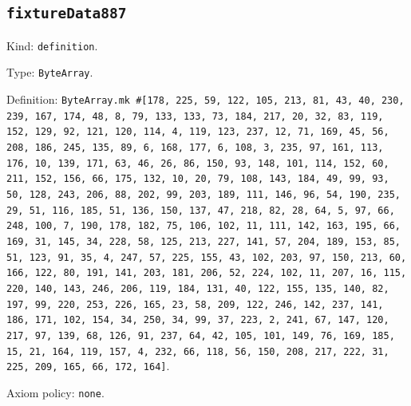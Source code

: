 \documentclass[11pt]{article}
\begin{document}
\subsection*{\texttt{fixtureData887}}
\noindent Kind: \texttt{definition}.\par
\noindent Type: \texttt{ByteArray}.\par
\noindent Definition: \texttt{ByteArray.mk \#[178, 225, 59, 122, 105, 213, 81, 43, 40, 230, 239, 167, 174, 48, 8, 79, 133, 133, 73, 184, 217, 20, 32, 83, 119, 152, 129, 92, 121, 120, 114, 4, 119, 123, 237, 12, 71, 169, 45, 56, 208, 186, 245, 135, 89, 6, 168, 177, 6, 108, 3, 235, 97, 161, 113, 176, 10, 139, 171, 63, 46, 26, 86, 150, 93, 148, 101, 114, 152, 60, 211, 152, 156, 66, 175, 132, 10, 20, 79, 108, 143, 184, 49, 99, 93, 50, 128, 243, 206, 88, 202, 99, 203, 189, 111, 146, 96, 54, 190, 235, 29, 51, 116, 185, 51, 136, 150, 137, 47, 218, 82, 28, 64, 5, 97, 66, 248, 100, 7, 190, 178, 182, 75, 106, 102, 11, 111, 142, 163, 195, 66, 169, 31, 145, 34, 228, 58, 125, 213, 227, 141, 57, 204, 189, 153, 85, 51, 123, 91, 35, 4, 247, 57, 225, 155, 43, 102, 203, 97, 150, 213, 60, 166, 122, 80, 191, 141, 203, 181, 206, 52, 224, 102, 11, 207, 16, 115, 220, 140, 143, 246, 206, 119, 184, 131, 40, 122, 155, 135, 140, 82, 197, 99, 220, 253, 226, 165, 23, 58, 209, 122, 246, 142, 237, 141, 186, 171, 102, 154, 34, 250, 34, 99, 37, 223, 2, 241, 67, 147, 120, 217, 97, 139, 68, 126, 91, 237, 64, 42, 105, 101, 149, 76, 169, 185, 15, 21, 164, 119, 157, 4, 232, 66, 118, 56, 150, 208, 217, 222, 31, 225, 209, 165, 66, 172, 164]}.\par
\noindent Axiom policy: \texttt{none}.\par
\end{document}
